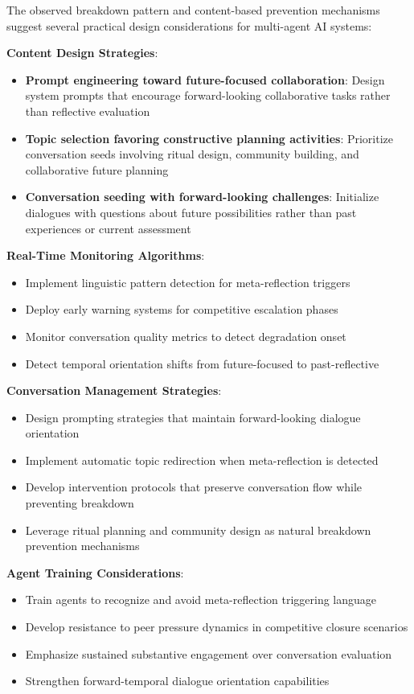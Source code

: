 \documentclass[11pt,letterpaper]{article}
\begin{document}
The observed breakdown pattern and content-based prevention mechanisms suggest several practical design considerations for multi-agent AI systems:

\textbf{Content Design Strategies}:
\begin{itemize}
    \item \textbf{Prompt engineering toward future-focused collaboration}: Design system prompts that encourage forward-looking collaborative tasks rather than reflective evaluation
    \item \textbf{Topic selection favoring constructive planning activities}: Prioritize conversation seeds involving ritual design, community building, and collaborative future planning
    \item \textbf{Conversation seeding with forward-looking challenges}: Initialize dialogues with questions about future possibilities rather than past experiences or current assessment
\end{itemize}

\textbf{Real-Time Monitoring Algorithms}:
\begin{itemize}
    \item Implement linguistic pattern detection for meta-reflection triggers
    \item Deploy early warning systems for competitive escalation phases
    \item Monitor conversation quality metrics to detect degradation onset
    \item Detect temporal orientation shifts from future-focused to past-reflective
\end{itemize}

\textbf{Conversation Management Strategies}:
\begin{itemize}
    \item Design prompting strategies that maintain forward-looking dialogue orientation
    \item Implement automatic topic redirection when meta-reflection is detected
    \item Develop intervention protocols that preserve conversation flow while preventing breakdown
    \item Leverage ritual planning and community design as natural breakdown prevention mechanisms
\end{itemize}

\textbf{Agent Training Considerations}:
\begin{itemize}
    \item Train agents to recognize and avoid meta-reflection triggering language
    \item Develop resistance to peer pressure dynamics in competitive closure scenarios
    \item Emphasize sustained substantive engagement over conversation evaluation
    \item Strengthen forward-temporal dialogue orientation capabilities
\end{itemize}
\end{document}
